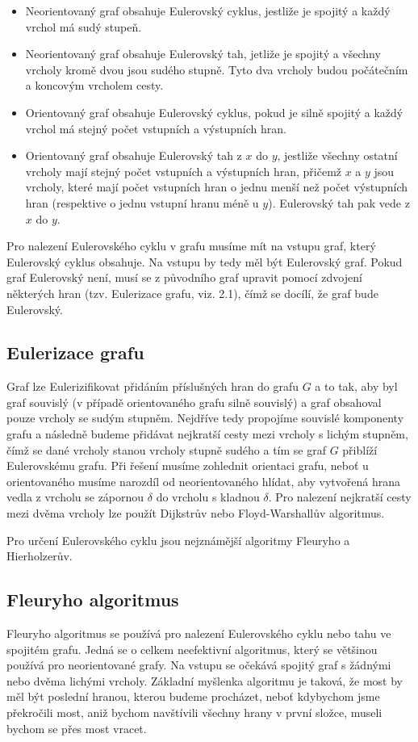 \documentclass[12pt, a4paper]{article}
\begin{document}
\begin{itemize}
  \item Neorientovaný graf obsahuje Eulerovský cyklus, jestliže je spojitý a každý vrchol má sudý stupeň.
  \item Neorientovaný graf obsahuje Eulerovský tah, jetliže je spojitý a všechny vrcholy kromě dvou jsou sudého stupně. Tyto dva vrcholy budou počátečním a koncovým vrcholem cesty. 
  \item Orientovaný graf obsahuje Eulerovský cyklus, pokud je silně spojitý a každý vrchol má stejný počet vstupních a výstupních hran.
  \item Orientovaný graf obsahuje Eulerovský tah z $x$ do $y$, jestliže všechny ostatní vrcholy mají stejný počet vstupních a výstupních hran, přičemž $x$ a $y$ jsou vrcholy, které mají počet vstupních hran o jednu menší než počet výstupních hran (respektive o jednu vstupní hranu méně u $y$). Eulerovský tah pak vede z $x$ do $y$.
\end{itemize}
Pro nalezení Eulerovského cyklu v grafu musíme mít na vstupu graf, který Eulerovský cyklus obsahuje. Na vstupu by tedy měl být Eulerovský graf. Pokud graf Eulerovský není, musí se z původního graf upravit pomocí zdvojení některých hran (tzv. Eulerizace grafu, viz. 2.1), čímž se docílí, že graf bude Eulerovský.

\subsection{Eulerizace grafu}
\label{s:1}
Graf lze Eulerizifikovat přidáním příslušných hran do grafu $G$ a to tak, aby byl graf souvislý (v případě orientovaného grafu silně souvislý) a graf obsahoval pouze vrcholy se sudým stupněm. Nejdříve tedy propojíme souvislé komponenty grafu a následně budeme přidávat nejkratší cesty mezi vrcholy s lichým stupněm, čímž se dané vrcholy stanou vrcholy stupně sudého a tím se graf $G$ přiblíží Eulerovskému grafu. Při řešení musíme zohlednit orientaci grafu, neboť u orientovaného musíme narozdíl od neorientovaného hlídat, aby vytvořená hrana vedla z vrcholu se zápornou $\delta$ do vrcholu s kladnou $\delta$. Pro nalezení nejkratší cesty mezi dvěma vrcholy lze použít Dijkstrův nebo Floyd-Warshallův algoritmus.
\newpage 

\noindent Pro určení Eulerovského cyklu jsou nejznámější algoritmy Fleuryho a Hierholzerův.
\subsection{Fleuryho algoritmus}
Fleuryho algoritmus \cite{stachnikproblem, Eulerian, Fleury} se používá pro nalezení Eulerovského cyklu nebo tahu ve spojitém grafu. Jedná se o celkem neefektivní algoritmus, který se většinou používá pro neorientované grafy. Na vstupu se očekává spojitý graf s žádnými nebo dvěma lichými vrcholy. Základní myšlenka algoritmu je taková, že most by měl být poslední hranou, kterou budeme procházet, neboť kdybychom jsme překročili most, aniž bychom navštívili všechny hrany v první složce, museli bychom se přes most vracet. 
\end{document}
